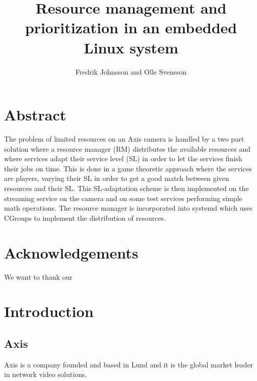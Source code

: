 \documentclass[nobiblatex]{LTHthesis}
\begin{document}
\begin{titlepages}
\author{Fredrik Johnsson and Olle Svensson}
\title{Resource management and prioritization in an embedded Linux system}

\end{titlepages}
\setcounter{page}{1}

\chapter*{Abstract}
The problem of limited resources on an Axis camera is handled by a two part solution where a resource manager (RM) distributes the available resources and where services adapt their service level (SL) in order to let the services finish their jobs on time. This is done in a game theoretic approach where the services are players, varying their SL in order to get a good match between given resources and their SL. This SL-adaptation scheme is then implemented on the streaming service on the camera and on some test services performing simple math operations. The resource manager is incorporated into systemd which uses CGroups \cite{cgroups} to implement the distribution of resources.

\chapter*{Acknowledgements}
We want to thank our 

\newpage
\tableofcontents
\newpage

\setcounter{page}{1}

\chapter{Introduction} %
\section{Axis}
Axis is a company founded and based in Lund and it is the global market leader in network video solutions. 
\end{document}
